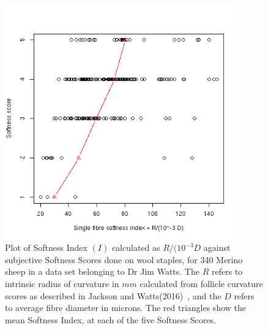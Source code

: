 %

\begin{figure}[!h]
  \centering
  \includegraphics[width=0.9\textwidth]{soft.png}
  \caption{Plot of Softness Index $(I)$ calculated as $R/(10^{-3} D$ against subjective Softness Scores done on wool staples, for 340 Merino sheep in a data set belonging to Dr Jim Watts. The $R$ refers to intrinsic radius of curvature in $mm$ calculated from follicle curvature scores as described in Jackson and Watts(2016)~\cite{jack:16b}, and the $D$ refers to average fibre diameter in microns. The red triangles show the mean Softness Index, at each of the five Softness Scores.}
  \label{fig:soft}
\end{figure}

%

